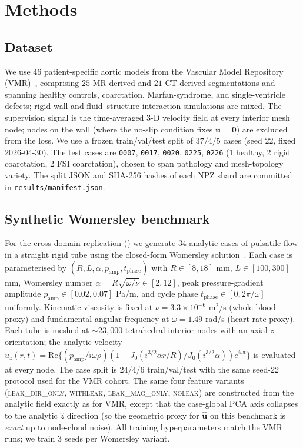 \documentclass[10pt,a4paper]{article}
\newcommand{\withleak}{\textsc{withleak}}
\newcommand{\dironly}{\textsc{leak\_dir\_only}}
\newcommand{\magonly}{\textsc{leak\_mag\_only}}
\newcommand{\noleak}{\textsc{noleak}}
\newcommand{\unit}[1]{\hat{\mathbf{#1}}}
\begin{document}
\section*{Methods}
\label{sec:methods}

\subsection*{Dataset}

We use $46$ patient-specific aortic models from the Vascular Model
Repository (VMR)~\cite{vmr}, comprising $25$ MR-derived and $21$
CT-derived segmentations and spanning healthy controls, coarctation,
Marfan-syndrome, and single-ventricle defects; rigid-wall and
fluid--structure-interaction simulations are mixed. The supervision
signal is the time-averaged 3-D velocity field at every interior
mesh node; nodes on the wall (where the no-slip condition fixes
$\mathbf{u}=\mathbf{0}$) are excluded from the loss. We use a frozen
train/val/test split of $37/4/5$ cases (seed 22, fixed
2026-04-30). The test cases are \texttt{0007}, \texttt{0017},
\texttt{0020}, \texttt{0225}, \texttt{0226} (1 healthy, 2 rigid
coarctation, 2 FSI coarctation), chosen to span pathology and
mesh-topology variety. The split JSON and SHA-256 hashes of each NPZ
shard are committed in \texttt{results/manifest.json}.

\subsection*{Synthetic Womersley benchmark}

For the cross-domain replication () we generate
$34$ analytic cases of pulsatile flow in a straight rigid tube using
the closed-form Womersley solution~\cite{womersley1955}. Each case is
parameterised by $(R, L, \alpha, p_\mathrm{amp}, t_\mathrm{phase})$
with $R\in[8, 18]$ mm, $L\in[100, 300]$ mm, Womersley number
$\alpha = R\sqrt{\omega/\nu}\in[2, 12]$, peak pressure-gradient
amplitude $p_\mathrm{amp}\in[0.02, 0.07]$ Pa/m, and cycle phase
$t_\mathrm{phase}\in[0, 2\pi/\omega]$ uniformly. Kinematic viscosity
is fixed at $\nu=3.3\times 10^{-6}$ m$^2$/s (whole-blood proxy) and
fundamental angular frequency at $\omega=1.49$ rad/s
(heart-rate proxy). Each tube is meshed at $\sim\!23{,}000$ tetrahedral
interior nodes with an axial $z$-orientation; the analytic velocity
$u_z(r, t) = \mathrm{Re}\{(p_\mathrm{amp}/i\omega\rho)(1 - J_0(i^{3/2}\alpha r/R)/J_0(i^{3/2}\alpha))e^{i\omega t}\}$
is evaluated at every node. The case split is $24/4/6$ train/val/test
with the same seed-22 protocol used for the VMR cohort. The same four
feature variants (\dironly{}, \withleak{}, \magonly{}, \noleak{}) are
constructed from the analytic field exactly as for VMR, except that
the case-global PCA axis collapses to the analytic $\hat{z}$
direction (so the geometric proxy for $\unit{u}$ on this benchmark is
\emph{exact} up to node-cloud noise). All training hyperparameters
match the VMR runs; we train $3$ seeds per Womersley variant.
\end{document}
